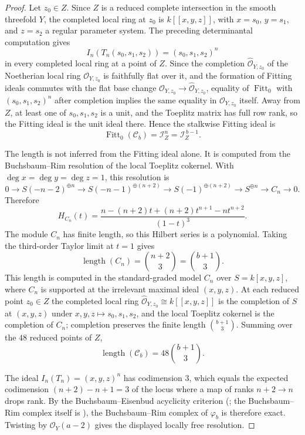 \documentclass[11pt]{article}
\theoremstyle{plain}
\theoremstyle{definition}
\theoremstyle{remark}
\newcommand{\cO}{\mathcal{O}}
\newcommand{\cI}{\mathcal{I}}
\newcommand{\cC}{\mathcal{C}}
\begin{document}
\begin{proof}
Let $z_0\in Z$.  Since $Z$ is a reduced complete intersection in the smooth threefold $Y$, the completed local ring at $z_0$ is $k[[x,y,z]]$, with $x=s_0$, $y=s_1$, and $z=s_2$ a regular parameter system.  The preceding determinantal computation gives
\[
I_n(T_n(s_0,s_1,s_2))=(s_0,s_1,s_2)^n
\]
in every completed local ring at a point of $Z$.  Since the completion $\widehat{\cO}_{Y,z_0}$ of the Noetherian local ring $\cO_{Y,z_0}$ is faithfully flat over it, and the formation of Fitting ideals commutes with the flat base change $\cO_{Y,z_0}\to\widehat{\cO}_{Y,z_0}$, equality of $\operatorname{Fitt}_0$ with $(s_0,s_1,s_2)^n$ after completion implies the same equality in $\cO_{Y,z_0}$ itself.  Away from $Z$, at least one of $s_0,s_1,s_2$ is a unit, and the Toeplitz matrix has full row rank, so the Fitting ideal is the unit ideal there.  Hence the stalkwise Fitting ideal is
\[
\operatorname{Fitt}_0(\cC_b)=\cI_Z^n=\cI_Z^{\,b-1}.
\]

The length is not inferred from the Fitting ideal alone.  It is computed from the Buchsbaum--Rim resolution of the local Toeplitz cokernel.  With $\deg x=\deg y=\deg z=1$, this resolution is
\[
0\to S(-n-2)^{\oplus n}
\to S(-n-1)^{\oplus(n+2)}
\to S(-1)^{\oplus(n+2)}
\to S^{\oplus n}
\to C_n
\to0.
\]
Therefore
\[
H_{C_n}(t)=
\frac{n-(n+2)t+(n+2)t^{n+1}-nt^{n+2}}{(1-t)^3}.
\]
The module $C_n$ has finite length, so this Hilbert series is a polynomial.  Taking the third-order Taylor limit at $t=1$ gives
\[
\operatorname{length}(C_n)=\binom{n+2}{3}=\binom{b+1}{3}.
\]
This length is computed in the standard-graded model $C_n$ over $S=k[x,y,z]$, where $C_n$ is supported at the irrelevant maximal ideal $(x,y,z)$.  At each reduced point $z_0\in Z$ the completed local ring $\widehat{\cO}_{Y,z_0}\cong k[[x,y,z]]$ is the completion of $S$ at $(x,y,z)$ under $x,y,z\mapsto s_0,s_1,s_2$, and the local Toeplitz cokernel is the completion of $C_n$; completion preserves the finite length $\binom{b+1}{3}$.  Summing over the $48$ reduced points of $Z$,
\[
\operatorname{length}(\cC_b)=48\binom{b+1}{3}.
\]

The ideal $I_n(T_n)=(x,y,z)^n$ has codimension $3$, which equals the expected codimension $(n+2)-n+1=3$ of the locus where a map of ranks $n+2\to n$ drops rank.  By the Buchsbaum--Eisenbud acyclicity criterion (\cite[Thm.~20.9]{Eisenbud}; the Buchsbaum--Rim complex itself is \cite[\S A2.6]{Eisenbud}), the Buchsbaum--Rim complex of $\varphi_b$ is therefore exact.  Twisting by $\cO_Y(a-2)$ gives the displayed locally free resolution.


\end{proof}
\end{document}
